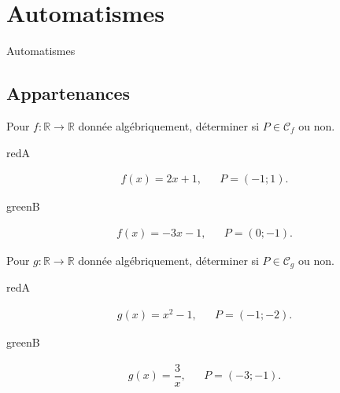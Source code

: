 \documentclass[14pt]{beamer}
\newcommand{\C}{\mathcal{C}}
\newcommand{\R}{\mathbb{R}}
\begin{document}
\section{Automatismes}

\begin{frame}

\centering \huge
Automatismes

\end{frame}

\subsection{Appartenances}

\begin{frame}{1}
	Pour $f:\R\rightarrow\R$ donnée algébriquement, déterminer si $P \in \C_f$ ou non.
	
		\begin{mybox}{red}{A}
		\begin{center}
			\begin{align*} f(x) = 2x+1, && P=(-1;1). \end{align*}
		\end{center}
		\end{mybox}
		\begin{mybox}{green}{B}
		\begin{center}
			\begin{align*} f(x) = -3x-1, && P=(0;-1). \end{align*}
		\end{center}
		\end{mybox}

\end{frame}


\begin{frame}{2}
	Pour $g:\R\rightarrow\R$ donnée algébriquement, déterminer si $P \in \C_g$ ou non.
	
		\begin{mybox}{red}{A}
		\begin{center}
			\begin{align*} g(x) = x^2 - 1, && P=(-1;-2). \end{align*}
		\end{center}
		\end{mybox}
		\begin{mybox}{green}{B}
		\begin{center}
			\begin{align*} g(x) = \dfrac3x, && P=(-3; -1). \end{align*}
		\end{center}
		\end{mybox}

\end{frame}
\end{document}
